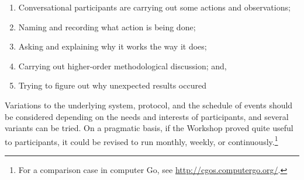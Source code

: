 \begin{center}
\begin{fminipage}{.8\columnwidth}
\begin{minipage}{1\textwidth}
\begin{enumerate}[itemsep=0pt,rightmargin=10pt]
\item Conversational participants are carrying
out some actions and observations;
\item Naming and recording what action is being done;
\item Asking and explaining why it works the way
it does;
\item Carrying out higher-order methodological discussion; and, 
\item Trying to figure out why unexpected results occured
\end{enumerate}
\end{minipage}
\end{fminipage}
\end{center}

Variations to the underlying system, protocol, and the schedule of
events should be considered depending on the needs and interests of
participants, and several variants can be tried.  On a pragmatic
basis, if the Workshop proved quite useful to participants, it could
be revised to run monthly, weekly, or continuously.\footnote{For a
  comparison case in computer Go, see
  \url{http://cgos.computergo.org/}.}


